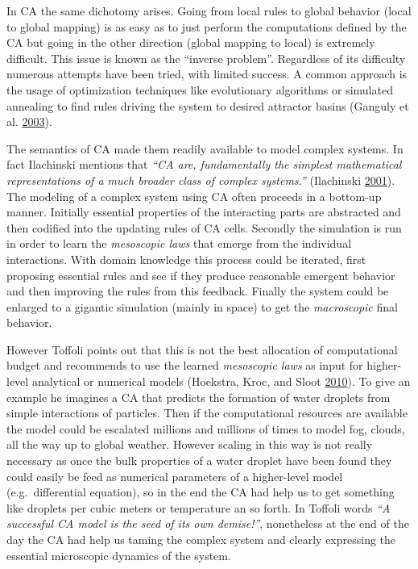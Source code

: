 \documentclass[
]{book}
\begin{document}
In CA the same dichotomy arises. Going from local rules to global behavior (local to global mapping) is as easy as to just perform the computations defined by the CA but going in the other direction (global mapping to local) is extremely difficult. This issue is known as the ``inverse problem''. Regardless of its difficulty numerous attempts have been tried, with limited success. A common approach is the usage of optimization techniques like evolutionary algorithms or simulated annealing to find rules driving the system to desired attractor basins (Ganguly et al. \protect\hyperlink{ref-ganguly2003survey}{2003}).

The semantics of CA made them readily available to model complex systems. In fact Ilachinski mentions that \emph{``CA are, fundamentally the simplest mathematical representations of a much broader class of complex systems.''} (Ilachinski \protect\hyperlink{ref-ilachinski2001cellular}{2001}). The modeling of a complex system using CA often proceeds in a bottom-up manner. Initially essential properties of the interacting parts are abstracted and then codified into the updating rules of CA cells. Secondly the simulation is run in order to learn the \emph{mesoscopic laws} that emerge from the individual interactions. With domain knowledge this process could be iterated, first proposing essential rules and see if they produce reasonable emergent behavior and then improving the rules from this feedback. Finally the system could be enlarged to a gigantic simulation (mainly in space) to get the \emph{macroscopic} final behavior.

However Toffoli points out that this is not the best allocation of computational budget and recommends to use the learned \emph{mesoscopic laws} as input for higher-level analytical or numerical models (Hoekstra, Kroc, and Sloot \protect\hyperlink{ref-hoekstra2010simulating}{2010}). To give an example he imagines a CA that predicts the formation of water droplets from simple interactions of particles. Then if the computational resources are available the model could be escalated millions and millions of times to model fog, clouds, all the way up to global weather. However scaling in this way is not really necessary as once the bulk properties of a water droplet have been found they could easily be feed as numerical parameters of a higher-level model (e.g.~differential equation), so in the end the CA had help us to get something like droplets per cubic meters or temperature an so forth. In Toffoli words \emph{``A successful CA model is the seed of its own demise!''}, nonetheless at the end of the day the CA had help us taming the complex system and clearly expressing the essential microscopic dynamics of the system.
\end{document}
